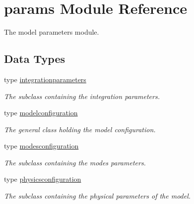 \hypertarget{namespaceparams}{}\section{params Module Reference}
\label{namespaceparams}


The model parameters module.  


\subsection*{Data Types}
\begin{DoxyCompactItemize}
\item 
type \hyperlink{structparams_1_1integrationparameters}{integrationparameters}
\begin{DoxyCompactList}\small\item\em The subclass containing the integration parameters. \end{DoxyCompactList}\item 
type \hyperlink{structparams_1_1modelconfiguration}{modelconfiguration}
\begin{DoxyCompactList}\small\item\em The general class holding the model configuration. \end{DoxyCompactList}\item 
type \hyperlink{structparams_1_1modesconfiguration}{modesconfiguration}
\begin{DoxyCompactList}\small\item\em The subclass containing the modes parameters. \end{DoxyCompactList}\item 
type \hyperlink{structparams_1_1physicsconfiguration}{physicsconfiguration}
\begin{DoxyCompactList}\small\item\em The subclass containing the physical parameters of the model. \end{DoxyCompactList}\end{DoxyCompactItemize}
